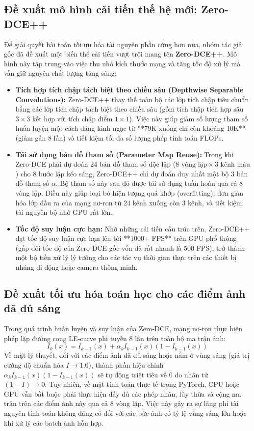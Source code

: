 \documentclass[a4paper]{article}
\begin{document}
\subsection{Đề xuất mô hình cải tiến thế hệ mới: Zero-DCE++}
Để giải quyết bài toán tối ưu hóa tài nguyên phần cứng hơn nữa, nhóm tác giả gốc đã đề xuất một biến thể cải tiến vượt trội mang tên \textbf{Zero-DCE++}. Mô hình này tập trung vào việc thu nhỏ kích thước mạng và tăng tốc độ xử lý mà vẫn giữ nguyên chất lượng tăng sáng:
\begin{itemize}
    \item \textbf{Tích hợp tích chập tách biệt theo chiều sâu (Depthwise Separable Convolutions):} Zero-DCE++ thay thế toàn bộ các lớp tích chập tiêu chuẩn bằng các lớp tích chập tách biệt theo chiều sâu (gồm tích chập tích hợp sâu $3 \times 3$ kết hợp với tích chập điểm $1 \times 1$). Việc này giúp giảm số lượng tham số huấn luyện một cách đáng kinh ngạc từ **79K xuống chỉ còn khoảng 10K** (giảm gần 8 lần) và tiết kiệm tối đa số lượng phép tính toán FLOPs.
    \item \textbf{Tái sử dụng bản đồ tham số (Parameter Map Reuse):} Trong khi Zero-DCE phải dự đoán 24 bản đồ tham số độc lập ($8 \text{ vòng lặp} \times 3 \text{ kênh màu}$) cho 8 bước lặp kéo sáng, Zero-DCE++ chỉ dự đoán duy nhất một bộ 3 bản đồ tham số $\alpha$. Bộ tham số này sau đó được tái sử dụng tuần hoàn qua cả 8 vòng lặp. Điều này giúp loại bỏ hiện tượng quá khớp (overfitting), đơn giản hóa lớp đầu ra của mạng nơ-ron từ 24 kênh xuống còn 3 kênh, và tiết kiệm tài nguyên bộ nhớ GPU rất lớn.
    \item \textbf{Tốc độ suy luận cực hạn:} Nhờ những cải tiến cấu trúc trên, Zero-DCE++ đạt tốc độ suy luận cực hạn lên tới **1000+ FPS** trên GPU phổ thông (gấp đôi tốc độ của Zero-DCE gốc vốn đã rất nhanh là 500 FPS), trở thành một bộ tiền xử lý lý tưởng cho các tác vụ thời gian thực trên các thiết bị nhúng di động hoặc camera thông minh.
\end{itemize}

\subsection{Đề xuất tối ưu hóa toán học cho các điểm ảnh đã đủ sáng}
Trong quá trình huấn luyện và suy luận của Zero-DCE, mạng nơ-ron thực hiện phép lặp đường cong LE-curve phi tuyến 8 lần trên toàn bộ ma trận ảnh:
\begin{equation}
    I_k(x) = I_{k-1}(x) + \alpha_k I_{k-1}(x)(1 - I_{k-1}(x))
\end{equation}
Về mặt lý thuyết, đối với các điểm ảnh đã đủ sáng hoặc nằm ở vùng sáng (giá trị cường độ chuẩn hóa $I \to 1.0$), thành phần hiệu chỉnh $\alpha_k I_{k-1}(x)(1 - I_{k-1}(x))$ sẽ tự động triệt tiêu về $0$ do nhân tử $(1 - I) \to 0$. Tuy nhiên, về mặt tính toán thực tế trong PyTorch, CPU hoặc GPU vẫn bắt buộc phải thực hiện đầy đủ các phép nhân, lũy thừa và cộng ma trận trên các điểm ảnh này qua cả 8 vòng lặp. Việc này gây ra sự lãng phí tài nguyên tính toán không đáng có đối với các bức ảnh có tỷ lệ vùng sáng lớn hoặc khi xử lý các batch ảnh hỗn hợp.
\end{document}
